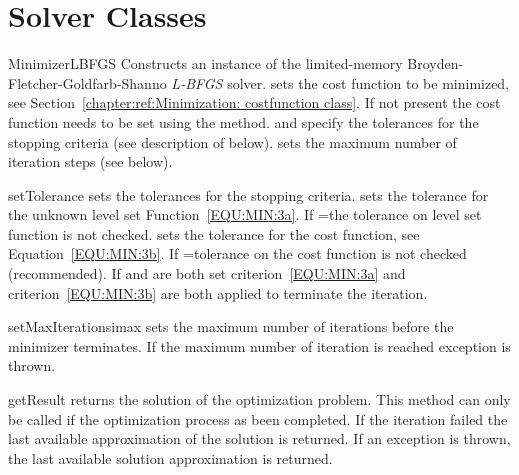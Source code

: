 \section{Solver Classes}

\begin{classdesc}{MinimizerLBFGS}{%
%
%
%
}
Constructs an instance of the limited-memory Broyden-Fletcher-Goldfarb-Shanno \emph{L-BFGS} solver.
 sets the cost function to be minimized, see Section~\ref{chapter:ref:Minimization: costfunction class}.
If not present the cost function needs to be set using the  method.
 and  specify the tolerances for the stopping
criteria (see description of  below).
 sets the maximum number of iteration steps (see
 below).
\end{classdesc}

\begin{methoddesc}[MinimizerLBFGS]{setTolerance}{}
sets the tolerances for the stopping criteria. 
 sets the tolerance for the unknown level set Function~\ref{EQU:MIN:3a}.
If =\None the tolerance on level set function is not checked.
 sets the tolerance for the cost function, see Equation~\ref{EQU:MIN:3b}.
If =\None tolerance on the cost function is not checked (recommended).
If  and  are both set criterion~\ref{EQU:MIN:3a}
and criterion~\ref{EQU:MIN:3b} are both applied to terminate the iteration.
\end{methoddesc}

\begin{methoddesc}[MinimizerLBFGS]{setMaxIterations}{imax}
sets the maximum number of iterations before the minimizer terminates. If 
the maximum number of iteration is reached  exception is thrown.
\end{methoddesc}

\begin{methoddesc}[MinimizerLBFGS]{getResult}{}
returns the solution of the optimization problem.
This method can only be called if the optimization process as been completed.
If the iteration failed the last available approximation of the solution is returned.
If an exception is thrown, the last available solution approximation is returned.
\end{methoddesc}

